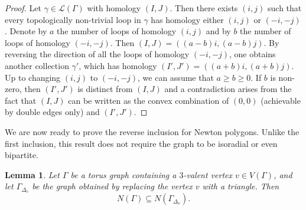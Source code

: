 \documentclass[12pt,a4paper]{article}
\newtheorem{lem}[thm]{Lemma}
\theoremstyle{definition}
\begin{document}
\begin{proof}
    Let $\gamma \in \mathcal{L}(\Gamma)$ with homology $(I, J)$. Then there exists $(i,j)$ such that every topologically non-trivial loop in $\gamma$ has homology either $(i,j)$ or $(-i,-j)$. Denote by $a$ the number of loops of homology $(i,j)$ and by $b$ the number of loops of homology $(-i,-j)$. Then $(I,J)=((a-b)i,(a-b)j)$. By reversing the direction of all the loops of homology $(-i,-j)$, one obtains another collection $\gamma'$, which has homology $(I',J')=((a+b)i,(a+b)j)$. Up to changing $(i,j)$ to $(-i,-j)$, we can assume that $a\geq b\geq 0$. If $b$ is non-zero, then $(I',J')$ is distinct from $(I,J)$ and a contradiction arises from the fact that $(I,J)$ can be written as the convex combination of $(0,0)$ (achievable by double edges only) and $(I',J')$.
\end{proof}

We are now ready to prove the reverse inclusion for Newton polygons. Unlike the first inclusion, this result does not require the graph to be isoradial or even bipartite.

\begin{lem} \label{N(Gamma) < N(Gamma_Delta_v)}
    Let $\Gamma$ be a torus graph containing a $3$-valent vertex $v \in V(\Gamma)$, and let $\Gamma_{\Delta_v}$ be the graph obtained by replacing the vertex $v$ with a triangle. Then
    \[N(\Gamma)\subseteq N(\Gamma_{\Delta_v}).\]
\end{lem}
\end{document}
